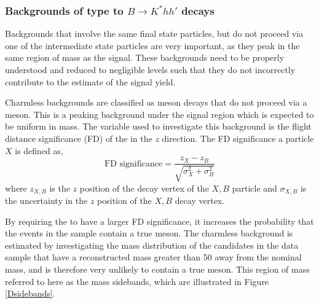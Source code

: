\subsubsection{Backgrounds of type to \boldmath$B \to K^*hh'$ decays}
\label{sec:backgrounds:charmless}

Backgrounds that involve the same final state particles, but do not proceed via one of the intermediate state particles are very important, as they peak in the same region of \Bm mass as the signal. These backgrounds need to be properly understood and reduced to negligible levels such that they do not incorrectly contribute to the estimate of the signal yield. 

Charmless backgrounds are classified as \Bm meson decays that do not proceed via a \Dz meson. This is a peaking background under the signal region which is expected to be uniform in \Dz mass. The variable used to investigate this background is the flight distance significance (FD) of the \Dz in the $z$ direction. The FD significance a particle $X$ is defined as, 
\begin{equation}
\text{FD significance} = \frac{z_X - z_B}{\sqrt{\sigma_X^2 + \sigma_B^2}}
\label{FDdefinition}
\end{equation}
where $z_{X,B}$ is the $z$ position of the decay vertex of the $X,B$ particle and $\sigma_{X,B}$ is the uncertainty in the $z$ position of the $X,B$ decay vertex.

By requiring the \Dz to have a larger FD significance, it increases the probability that the events in the sample contain a true \Dz meson. The charmless background is estimated by investigating the \Bm mass distribution of the candidates in the data sample that have a reconstructed \Dz mass greater than 50 \mevcc away from the nominal \Dz mass, and is therefore very unlikely to contain a true \Dz meson. This region of \Dz mass referred to here as the \Dz mass sidebands, which are illustrated in Figure \ref{Dsidebands}.

